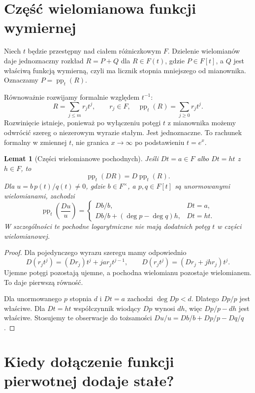 \documentclass[11pt,a4paper,oneside]{book}
\numberwithin{equation}{section}
\theoremstyle{plain}
\newtheorem{lemat}[twierdzenie]{Lemat}
\theoremstyle{definition}
\theoremstyle{remark}
\begin{document}
\section{Część wielomianowa funkcji wymiernej}

Niech $t$ będzie przestępny nad ciałem różniczkowym $F$. Dzielenie wielomianów daje jednoznaczny rozkład $R=P+Q$ dla $R\in F(t)$, gdzie $P\in F[t]$, a $Q$ jest właściwą funkcją wymierną, czyli ma licznik stopnia mniejszego od mianownika. Oznaczamy $P=\operatorname{pp}_t(R)$.

Równoważnie rozwijamy formalnie względem $t^{-1}$:
\[
R=\sum_{j\le m}r_jt^j,\qquad r_j\in F,\quad
\operatorname{pp}_t(R)=\sum_{j\ge0}r_jt^j.
\]
Rozwinięcie istnieje, ponieważ po wyłączeniu potęgi $t$ z mianownika możemy odwrócić szereg o niezerowym wyrazie stałym. Jest jednoznaczne. To rachunek formalny w zmiennej $t$, nie granica $x\to\infty$ po podstawieniu $t=e^x$.

\begin{lemat}[Części wielomianowe pochodnych]
Jeśli $Dt=a\in F$ albo $Dt=ht$ z $h\in F$, to
\[
\operatorname{pp}_t(DR)=D\operatorname{pp}_t(R).
\]
Dla $u=b\,p(t)/q(t)\ne0$, gdzie $b\in F^\times$, a $p,q\in F[t]$ są unormowanymi wielomianami, zachodzi
\[
\operatorname{pp}_t\left(\frac{Du}{u}\right)=
\begin{cases}
Db/b, & Dt=a,\\
Db/b+(\deg p-\deg q)h, & Dt=ht.
\end{cases}
\]
W szczególności te pochodne logarytmiczne nie mają dodatnich potęg $t$ w części wielomianowej.
\end{lemat}
\begin{proof}
Dla pojedynczego wyrazu szeregu mamy odpowiednio
\[
D(r_jt^j)=(Dr_j)t^j+j a r_jt^{j-1},\qquad
D(r_jt^j)=(Dr_j+jhr_j)t^j.
\]
Ujemne potęgi pozostają ujemne, a pochodna wielomianu pozostaje wielomianem. To daje pierwszą równość.

Dla unormowanego $p$ stopnia $d$ i $Dt=a$ zachodzi $\deg Dp<d$. Dlatego $Dp/p$ jest właściwe. Dla $Dt=ht$ współczynnik wiodący $Dp$ wynosi $dh$, więc $Dp/p-dh$ jest właściwe. Stosujemy te obserwacje do tożsamości $Du/u=Db/b+Dp/p-Dq/q$.
\end{proof}

\section{Kiedy dołączenie funkcji pierwotnej dodaje stałe?}
\end{document}
